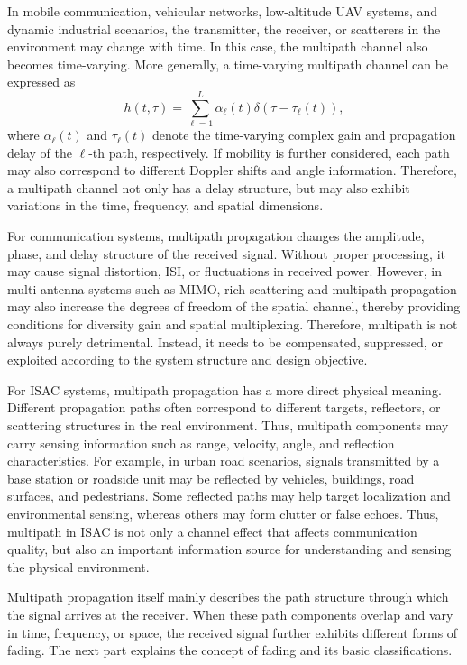In mobile communication,
vehicular networks,
low-altitude UAV systems,
and dynamic industrial scenarios,
the transmitter,
the receiver,
or scatterers in the environment may change with time.
In this case,
the multipath channel also becomes time-varying.
More generally,
a time-varying multipath channel can be expressed as
\begin{equation}
    h(t,\tau)
    =
    \sum_{\ell=1}^{L}
    \alpha_{\ell}(t)
    \delta
    \left(
        \tau-\tau_{\ell}(t)
    \right),
    \label{eq:time-varying-multipath-channel}
\end{equation}
where
\(\alpha_{\ell}(t)\) and \(\tau_{\ell}(t)\)
denote the time-varying complex gain and propagation delay of the \(\ell\)-th path,
respectively.
If mobility is further considered,
each path may also correspond to different Doppler shifts and angle information.
Therefore,
a multipath channel not only has a delay structure,
but may also exhibit variations in the time,
frequency,
and spatial dimensions.

For communication systems,
multipath propagation changes the amplitude,
phase,
and delay structure of the received signal.
Without proper processing,
it may cause signal distortion,
ISI,
or fluctuations in received power.
However,
in multi-antenna systems such as MIMO,
rich scattering and multipath propagation may also increase the degrees of freedom of the spatial channel,
thereby providing conditions for diversity gain and spatial multiplexing.
Therefore,
multipath is not always purely detrimental.
Instead,
it needs to be compensated,
suppressed,
or exploited according to the system structure and design objective.

For ISAC systems,
multipath propagation has a more direct physical meaning.
Different propagation paths often correspond to different targets,
reflectors,
or scattering structures in the real environment.
Thus,
multipath components may carry sensing information such as range,
velocity,
angle,
and reflection characteristics.
For example,
in urban road scenarios,
signals transmitted by a base station or roadside unit may be reflected by vehicles,
buildings,
road surfaces,
and pedestrians.
Some reflected paths may help target localization and environmental sensing,
whereas others may form clutter or false echoes.
Thus, multipath in ISAC is not only a channel effect that affects communication quality,
but also an important information source for understanding and sensing the physical environment.

Multipath propagation itself mainly describes the path structure through which the signal arrives at the receiver.
When these path components overlap and vary in time,
frequency,
or space,
the received signal further exhibits different forms of fading.
The next part explains the concept of fading and its basic classifications.


